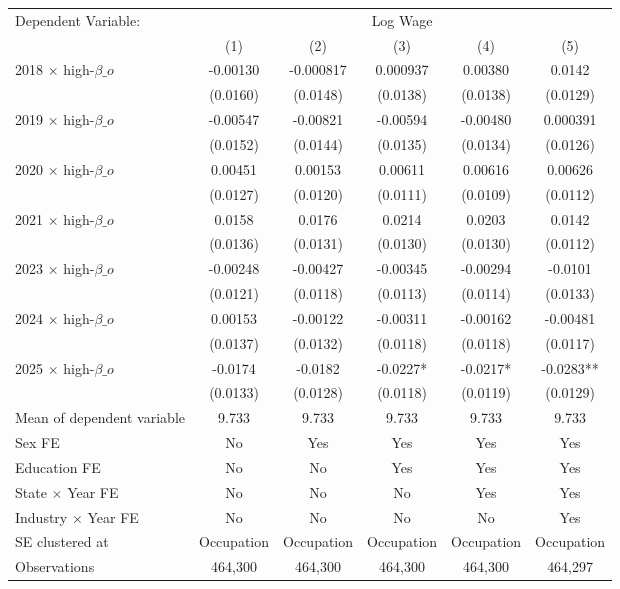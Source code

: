 \def\sym#1{\ifmmode^{#1}\else\(^{#1}\)\fi}
\begin{tabular}{l*{5}{c}}
\toprule
Dependent Variable: & \multicolumn{5}{c}{Log Wage} \\
\cmidrule(lr){2-6}
 & (1) & (2) & (3) & (4) & (5) \\
\midrule
2018 $\times$ high-$\beta\_o$&    -0.00130   &   -0.000817   &    0.000937   &     0.00380   &      0.0142   \\
            &    (0.0160)   &    (0.0148)   &    (0.0138)   &    (0.0138)   &    (0.0129)   \\
2019 $\times$ high-$\beta\_o$&    -0.00547   &    -0.00821   &    -0.00594   &    -0.00480   &    0.000391   \\
            &    (0.0152)   &    (0.0144)   &    (0.0135)   &    (0.0134)   &    (0.0126)   \\
2020 $\times$ high-$\beta\_o$&     0.00451   &     0.00153   &     0.00611   &     0.00616   &     0.00626   \\
            &    (0.0127)   &    (0.0120)   &    (0.0111)   &    (0.0109)   &    (0.0112)   \\
2021 $\times$ high-$\beta\_o$&      0.0158   &      0.0176   &      0.0214   &      0.0203   &      0.0142   \\
            &    (0.0136)   &    (0.0131)   &    (0.0130)   &    (0.0130)   &    (0.0112)   \\
2023 $\times$ high-$\beta\_o$&    -0.00248   &    -0.00427   &    -0.00345   &    -0.00294   &     -0.0101   \\
            &    (0.0121)   &    (0.0118)   &    (0.0113)   &    (0.0114)   &    (0.0133)   \\
2024 $\times$ high-$\beta\_o$&     0.00153   &    -0.00122   &    -0.00311   &    -0.00162   &    -0.00481   \\
            &    (0.0137)   &    (0.0132)   &    (0.0118)   &    (0.0118)   &    (0.0117)   \\
2025 $\times$ high-$\beta\_o$&     -0.0174   &     -0.0182   &     -0.0227*  &     -0.0217*  &     -0.0283** \\
            &    (0.0133)   &    (0.0128)   &    (0.0118)   &    (0.0119)   &    (0.0129)   \\
\midrule
Mean of dependent variable&       9.733   &       9.733   &       9.733   &       9.733   &       9.733   \\
Sex FE      &          No   &         Yes   &         Yes   &         Yes   &         Yes   \\
Education FE&          No   &          No   &         Yes   &         Yes   &         Yes   \\
State $\times$ Year FE&          No   &          No   &          No   &         Yes   &         Yes   \\
Industry $\times$ Year FE&          No   &          No   &          No   &          No   &         Yes   \\
SE clustered at&  Occupation   &  Occupation   &  Occupation   &  Occupation   &  Occupation   \\
Observations&     464,300   &     464,300   &     464,300   &     464,300   &     464,297   \\
\bottomrule
\end{tabular}
